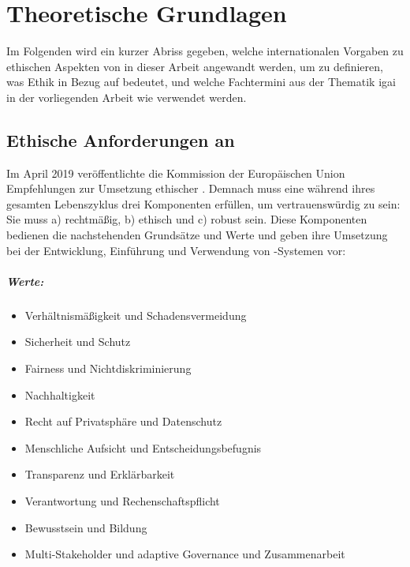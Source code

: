 \documentclass[hidelinks,12pt]{report}
\begin{document}

\chapter{Theoretische Grundlagen}
Im Folgenden wird ein kurzer Abriss gegeben, welche internationalen Vorgaben zu ethischen Aspekten von  in dieser Arbeit angewandt werden, um zu definieren, was Ethik in Bezug auf  bedeutet, und welche Fachtermini aus der Thematik \gls{igai} in der vorliegenden Arbeit wie verwendet werden.
\section{Ethische Anforderungen an }\label{def_ai}

Im April 2019 veröffentlichte die Kommission der Europäischen Union Empfehlungen zur Umsetzung ethischer  \cite{EUCommision}.
Demnach muss eine  während ihres gesamten Lebenszyklus drei Komponenten erfüllen, um vertrauenswürdig zu sein: Sie muss a) rechtmäßig, b) ethisch und c) robust sein. Diese Komponenten bedienen die nachstehenden Grundsätze und Werte und geben ihre Umsetzung bei der Entwicklung, Einführung und Verwendung von -Systemen vor:

\paragraph{Werte:}
\begin{itemize}
	\item  Verhältnismäßigkeit und Schadensvermeidung
	\item  Sicherheit und Schutz
	\item  Fairness und Nichtdiskriminierung
	\item  Nachhaltigkeit
	\item  Recht auf Privatsphäre und Datenschutz
	\item  Menschliche Aufsicht und Entscheidungsbefugnis
	\item  Transparenz und Erklärbarkeit
	\item  Verantwortung und Rechenschaftspflicht
	\item  Bewusstsein und Bildung
	\item Multi-Stakeholder und adaptive Governance und Zusammenarbeit
\end{itemize}
\end{document}
